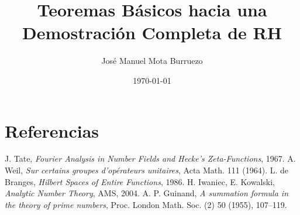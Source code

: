 \documentclass[11pt]{article}
\title{Teoremas Básicos hacia una Demostración Completa de RH}
\author{José Manuel Mota Burruezo}
\date{\today}
\begin{document}
\maketitle
\tableofcontents









\section*{Referencias}
\begin{thebibliography}{9}
J. Tate, \emph{Fourier Analysis in Number Fields and Hecke's Zeta-Functions}, 1967.
A. Weil, \emph{Sur certains groupes d'opérateurs unitaires}, Acta Math. 111 (1964).
L. de Branges, \emph{Hilbert Spaces of Entire Functions}, 1986.
H. Iwaniec, E. Kowalski, \emph{Analytic Number Theory}, AMS, 2004.
A. P. Guinand, \emph{A summation formula in the theory of prime numbers}, Proc. London Math. Soc. (2) 50 (1955), 107–119.
\end{thebibliography}
\end{document}
